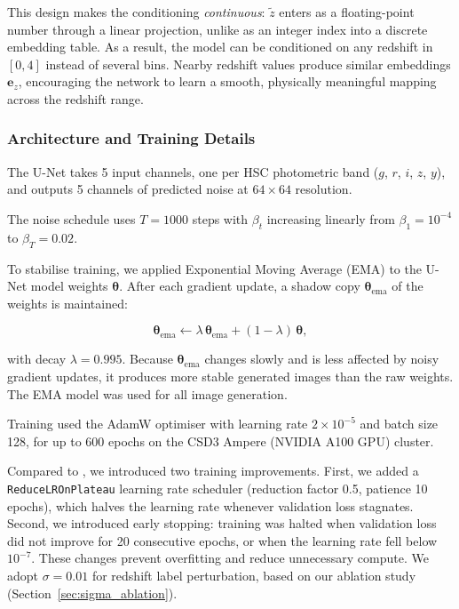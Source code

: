 \documentclass[fleqn,usenatbib]{mnras}
\begin{document}
This design makes the conditioning \emph{continuous}: 
$\tilde{z}$ enters as a floating-point number through a linear
projection, unlike as an integer index into a discrete embedding
table. As a result, the model can be conditioned on any redshift in $[0, 4]$ instead of several bins.
Nearby redshift values produce similar embeddings $\mathbf{e}_z$,
encouraging the network to learn a smooth, physically meaningful
mapping across the redshift range.

\subsubsection{Architecture and Training Details}

The U-Net takes 5 input channels, one per HSC photometric band
($g$, $r$, $i$, $z$, $y$), and outputs 5 channels of predicted noise
at $64 \times 64$ resolution.

The noise schedule uses $T = 1000$ steps with $\beta_t$ increasing
linearly from $\beta_1 = 10^{-4}$ to $\beta_T = 0.02$.

To stabilise training, we applied Exponential Moving Average
(EMA) \citep{karras2024} to the U-Net model weights $\boldsymbol{\theta}$.
After each gradient update, a shadow copy
$\boldsymbol{\theta}_{\mathrm{ema}}$ of the weights is maintained:

\begin{equation}
    \boldsymbol{\theta}_{\mathrm{ema}}
        \leftarrow \lambda\,\boldsymbol{\theta}_{\mathrm{ema}}
        + (1-\lambda)\,\boldsymbol{\theta},
    \label{eq:ema}
\end{equation}

with decay $\lambda = 0.995$.
Because $\boldsymbol{\theta}_{\mathrm{ema}}$ changes slowly and is
less affected by noisy gradient updates, it produces more stable
generated images than the raw weights.
The EMA model was used for all image generation.

Training used the AdamW optimiser \citep{loshchilov2019} with learning
rate $2 \times 10^{-5}$ and batch size 128, for up to 600 epochs on
the CSD3 Ampere (NVIDIA A100 GPU) cluster.

Compared to \citet{lizarraga2024}, we introduced two training
improvements.
First, we added a \texttt{ReduceLROnPlateau} learning rate scheduler
(reduction factor 0.5, patience 10 epochs), which halves the learning
rate whenever validation loss stagnates.
Second, we introduced early stopping: training was halted when
validation loss did not improve for 20 consecutive epochs, or when
the learning rate fell below $10^{-7}$.
These changes prevent overfitting and reduce unnecessary compute.
We adopt $\sigma = 0.01$ for redshift label perturbation, based on
our ablation study (Section~\ref{sec:sigma_ablation}).
\end{document}
